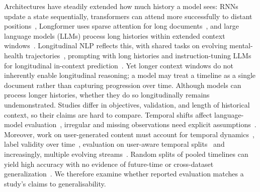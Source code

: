 \documentclass[11pt]{article}
\theoremstyle{plain}
\theoremstyle{definition}
\theoremstyle{remark}
\begin{document}
Architectures have steadily extended how much history a model sees: RNNs update a state sequentially, transformers can attend more successfully to distant positions~\cite{vaswani2023attentionneed}, Longformer uses sparse attention for long documents~\cite{beltagy2020longformer}, and large language models (LLMs) process long histories within extended context windows~\cite{brown2020language,bommasani2022opportunitiesrisksfoundationmodels}. Longitudinal NLP reflects this, with shared tasks on evolving mental-health trajectories~\cite{tseriotou-etal-2025-overview,ali-etal-2026-overview, soni-etal-2026-semeval}, prompting with long histories \citep{kruse-etal-2025-large} and instruction-tuning LLMs for longitudinal in-context prediction~\cite{ali2026liftenableincontextlearning, cui2025timer}. Yet longer context windows do not inherently enable longitudinal reasoning; a model may treat a timeline as a single document rather than capturing progression over time. Although models can process longer histories, whether they do so longitudinally remains undemonstrated. Studies differ in objectives, validation, and length of historical context, so their claims are hard to compare. Temporal shifts affect language-model evaluation~\cite{lazaridou2021mindgapassessingtemporal}, irregular and missing observations need explicit assumptions~\cite{perveen2020handling,bazo2020handling}. Moreover, work on user-generated content must account for temporal dynamics~\cite{tabak2020temporalmentalhealthdynamics}, label validity over time~\cite{harrigian-dredze-2022-now}, evaluation on user-aware temporal splits~\cite{ganesan2026word} and increasingly, multiple evolving streams~\cite{hills-etal-2026-multistream}. Random splits of pooled timelines can yield high accuracy with no evidence of future-time or cross-dataset generalization~\cite{tsakalidis2018can}. We therefore examine whether reported evaluation matches a study's claims to generalisability.
\end{document}

